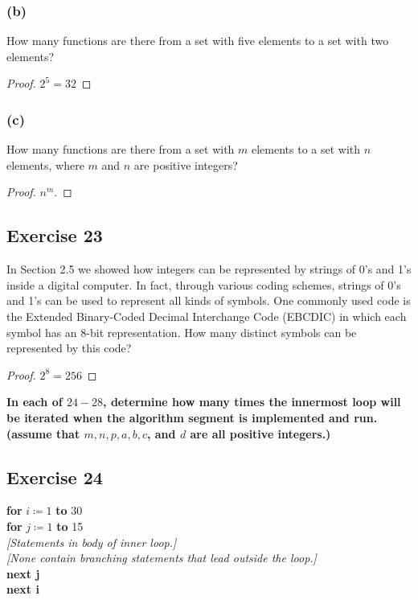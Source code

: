 \documentclass[14pt]{extarticle}
\newcommand{\cy}{\color{cyan}}
\begin{document}
\subsubsection{(b)}
How many functions are there from a set with five elements to a set with two elements?

\begin{proof}
\(2^5 = 32\)
\end{proof}

\subsubsection{(c)}
How many functions are there from a set with $m$ elements to a set with $n$ elements, where $m$ and $n$ are positive 
integers?

\begin{proof}
\(n^m\).
\end{proof}

\subsection{Exercise 23}
In Section 2.5 we showed how integers can be represented by strings of 0’s and 1’s inside a digital computer. In fact, 
through various coding schemes, strings of 0’s and 1’s can be used to represent all kinds of symbols. One commonly 
used code is the Extended Binary-Coded Decimal Interchange Code (EBCDIC) in which each symbol has an 8-bit 
representation. How many distinct symbols can be represented by this code?

\begin{proof}
\(2^8 = 256\)
\end{proof}

{\bf \cy In each of $24-28$, determine how many times the innermost loop will be iterated when the algorithm segment 
is implemented and run. (assume that \(m, n, p, a, b, c\), and $d$ are all positive integers.)}

\subsection{Exercise 24}
\begin{tabbing}
{\bf for} \= \(i \coloneqq 1\) {\bf to} 30 \\
          \> {\bf for} \= \(j \coloneqq 1\) {\bf to} 15 \\
          \>           \> {\it [Statements in body of inner loop.]} \\
          \>           \> {\it [None contain branching statements that lead outside the loop.]} \\
          \> {\bf next j} \\
{\bf next i}
\end{tabbing}
\end{document}
